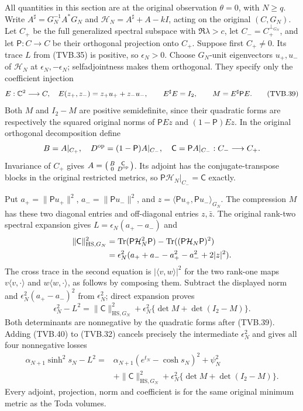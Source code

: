 All quantities in this section are at the original observation
$\theta=0$, with $N\ge q$. Write
$A^\sharp=G_N^{-1}A^*G_N$ and
$\mathcal H_N=A^\sharp+A-kI$, acting on the original $(C,G_N)$.
Let $C_+$ be the full generalized spectral subspace with
$\Re\lambda>c$, let $C_-=C_+^{\perp_{G_N}}$, and let
$\mathsf P:C\to C$ be their orthogonal projection onto $C_+$.
Suppose first $C_+\ne0$. Its trace $L$ from (TVB.35) is positive,
so $\epsilon_N>0$. Choose $G_N$-unit eigenvectors $u_+,u_-$
of $\mathcal H_N$ at $\epsilon_N,-\epsilon_N$; selfadjointness
makes them orthogonal. They specify only the coefficient injection
\[
 E:\mathbb{C}^2\longrightarrow C,\quad E(z_+,z_-)=z_+u_++z_-u_-,
 \qquad E^\sharp E=I_2,\qquad M=E^\sharp\mathsf P E.
 \tag{TVB.39}
\]
Both $M$ and $I_2-M$ are positive semidefinite, since their
quadratic forms are respectively the squared original norms of
$\mathsf PEz$ and $(1-\mathsf P)Ez$.
In the original orthogonal decomposition define
\[
 B=A|_{C_+},\quad D^{\rm op}=(1-\mathsf P)A|_{C_-},\quad
 \mathsf C=\mathsf PA|_{C_-}:C_-\longrightarrow C_+.
\]
Invariance of $C_+$ gives
$A=\left(\begin{smallmatrix}B&\mathsf C\\0&D^{\rm op}\end{smallmatrix}\right)$.
Its adjoint has the conjugate-transpose blocks in the original
restricted metrics, so
$\mathsf P\mathcal H_N|_{C_-}=\mathsf C$ exactly.

Put $a_+=\|\mathsf Pu_+\|^2$, $a_-=\|\mathsf Pu_-\|^2$,
and $z=\langle\mathsf Pu_+,\mathsf Pu_-\rangle_{G_N}$.
The compression $M$ has these two diagonal entries and off-diagonal
entries $z,\bar z$. The original rank-two spectral expansion gives
$L=\epsilon_N(a_+-a_-)$ and
\[
 \begin{split}
 \|\mathsf C\|_{\mathrm{HS},G_N}^2
 &=\operatorname{Tr}(\mathsf P\mathcal H_N^2\mathsf P)
                 -\operatorname{Tr}((\mathsf P\mathcal H_N\mathsf P)^2)\\
 &=\epsilon_N^2(a_++a_--a_+^2-a_-^2+2|z|^2).
 \end{split}
\]
The cross trace in the second equation is $|\langle v,w\rangle|^2$
for the two rank-one maps $v\langle v,\cdot\rangle$ and
$w\langle w,\cdot\rangle$, as follows by composing them.
Subtract the displayed norm and $\epsilon_N^2(a_+-a_-)^2$
from $\epsilon_N^2$; direct expansion proves
\[
 \epsilon_N^2-L^2
 =\|\mathsf C\|_{\mathrm{HS},G_N}^2
       +\epsilon_N^2\{\det M+\det(I_2-M)\}.
 \tag{TVB.40}
\]
Both determinants are nonnegative by the quadratic forms after
(TVB.39). Adding (TVB.40) to (TVB.32) cancels precisely the
intermediate $\epsilon_N^2$ and gives all four nonnegative losses
\[
 \boxed{\begin{aligned}
 \alpha_{N+1}\sinh^2s_N-L^2
 ={}&\alpha_{N+1}(e^{t_N}-\cosh s_N)^2+\psi_N^2\\
 &+\|\mathsf C\|_{\mathrm{HS},G_N}^2
       +\epsilon_N^2\{\det M+\det(I_2-M)\}.
 \end{aligned}}
 \tag{TVB.41}
\]
Every adjoint, projection, norm and coefficient is for the same
original minimum metric as the Toda volumes.

